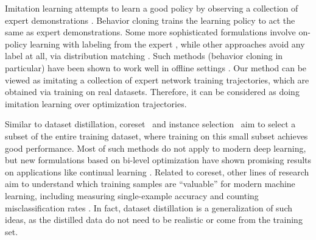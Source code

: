 Imitation learning attempts to learn a good policy by observing a collection of expert demonstrations \cite{osa2018algorithmic,peng2018deepmimic,peng2021amp}. Behavior cloning trains the learning policy to act the same as expert demonstrations. Some more sophisticated formulations involve on-policy learning with labeling from the expert \cite{ross2011reduction}, while other approaches avoid any label at all, \eg via distribution matching
\cite{ho2016generative}. Such methods (behavior cloning in particular) have been shown to work well in offline settings \cite{fu2020d4rl,gulcehre2020rl}. 
Our method can be viewed as imitating a collection of expert network training trajectories, which are obtained via training on real datasets. Therefore, it can be considered as doing imitation learning over optimization trajectories.

Similar to dataset distillation, coreset~\cite{tsang2005core,har2007smaller,bachem2017practical,sener2018active,chen2010super} and instance selection~\cite{olvera2010review} aim to select a subset of the entire training dataset, where training on this small subset achieves good performance. Most of such methods do not apply to modern deep learning, but new formulations based on bi-level optimization have shown promising results on applications like continual learning \cite{borsos2020coresets}. Related to coreset, other lines of research aim to understand which training samples are    ``valuable'' for modern machine learning, including measuring single-example accuracy \citep{lapedriza2013all} and counting misclassification rates \citep{toneva2018empirical}. In fact, dataset distillation is a generalization of such ideas, as the distilled data do not need to be realistic or come from the training set.






